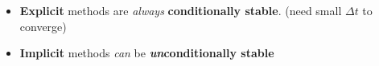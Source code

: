 \begin{itemize}[label=-]
    \item \textbf{Explicit} methods are \textit{always} \textbf{conditionally stable}. (need small $\Delta t$ to converge)
    \item \textbf{Implicit} methods \textit{can} be \textbf{\textit{un}conditionally stable}
\end{itemize}